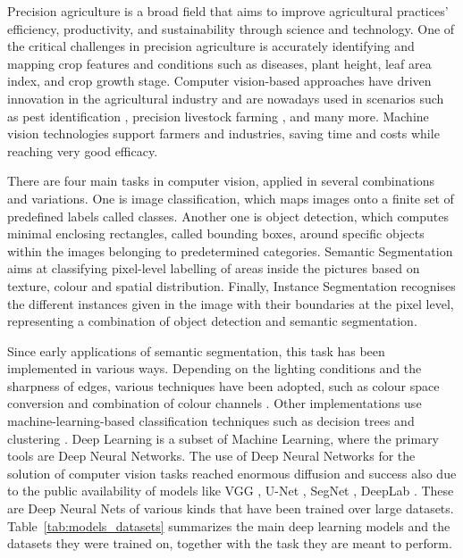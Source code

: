 \documentclass[runningheads]{llncs}
\begin{document}
Precision agriculture is a broad field that aims to improve agricultural practices' efficiency, productivity, and sustainability through science and technology. One of the critical challenges in precision agriculture is accurately identifying and mapping crop features and conditions such as diseases, plant height, leaf area index, and crop growth stage. Computer vision-based approaches have driven innovation in the agricultural industry and are nowadays used in scenarios such as pest identification \cite{yuan_advanced_2022}, precision livestock farming \cite{QIAO2019104958}, and many more.  Machine vision technologies support farmers and industries, saving time and costs while reaching very good efficacy. 

There are four main tasks in computer vision, applied in several combinations and variations. One is image classification, which maps images onto a finite set of predefined labels called classes. Another one is object detection, which computes minimal enclosing rectangles, called bounding boxes, around specific objects within the images belonging to predetermined categories. Semantic Segmentation aims at classifying pixel-level labelling of areas inside the pictures based on texture, colour and spatial distribution. Finally, Instance Segmentation recognises the different instances given in the image with their boundaries at the pixel level, representing a combination of object detection and semantic segmentation.

Since early applications of semantic segmentation, this task has been implemented in various ways. Depending on the lighting conditions and the sharpness of edges, various techniques have been adopted, such as colour space conversion and combination of colour channels \cite{RIEHLE2020105201}. Other implementations use machine-learning-based classification techniques such as decision trees \cite{YANG2015149} and clustering \cite{ZHANG202282}. Deep Learning is a subset of Machine Learning, where the primary tools are Deep Neural Networks. The use of Deep Neural Networks for the solution of computer vision tasks reached enormous diffusion and success also due to the public availability of models like VGG \cite{simonyan2015vgg}, U-Net \cite{ronneberger2015unet}, SegNet \cite{badrinarayanan2016segnet}, DeepLab \cite{chen2017deeplab}. These are Deep Neural Nets of various kinds that have been trained over large datasets. Table~\ref{tab:models_datasets} summarizes the main deep learning models and the datasets they were trained on, together with the task they are meant to perform.
\end{document}
